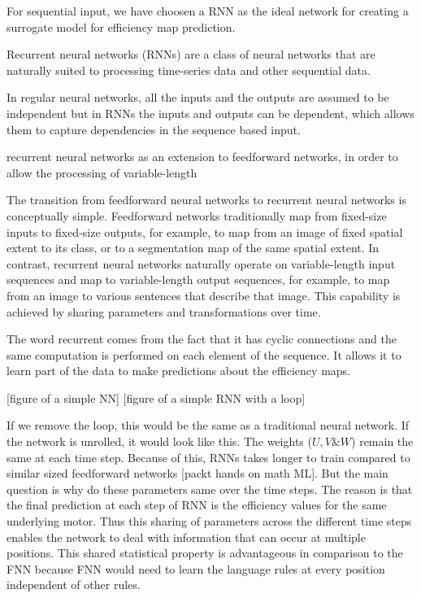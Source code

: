 For sequential input, we have choosen a RNN as the ideal network for creating a surrogate model for efficiency map prediction.

Recurrent neural networks (RNNs) are a class of neural networks that are naturally suited to processing time-series data and other sequential data.

In regular neural networks, all the inputs and the outputs are assumed to be independent but in RNNs the inputs and outputs can be dependent, which allows them to capture dependencies in the sequence based input. 

recurrent neural networks as an extension to feedforward networks, in order to allow the processing of variable-length

The transition from feedforward neural networks to recurrent neural networks is conceptually simple. Feedforward networks traditionally map from fixed-size inputs to fixed-size outputs, for example, to map from an image of fixed spatial extent to its class, or to a segmentation map of the same spatial extent. In contrast, recurrent neural networks naturally operate on variable-length input sequences and map to variable-length output sequences, for example, to map from an image to various sentences that describe that image. This capability is achieved by sharing parameters and transformations over time.


The word recurrent comes from the fact that it has cyclic connections and the same computation is performed on each element of the sequence. It allows it to learn part of the data to make predictions about the efficiency maps.

[figure of a simple NN]
[figure of a simple RNN with a loop]

If we remove the loop, this would be the same as a traditional neural network. If the network is unrolled, it would look like this. The weights ($U, V \& W$) remain the same at each time step. Because of this, RNNs takes longer to train compared to similar sized feedforward networks [packt hands on math ML]. But the main question is why do these parameters same over the time steps. The reason is that the final prediction at each step of RNN is the efficiency values for the same underlying motor. Thus this sharing of parameters across the different time steps enables the network to deal with information that can occur at multiple positions. This shared statistical property is advantageous in comparison to the FNN because FNN would need to learn the language rules at every position independent of other rules. 

